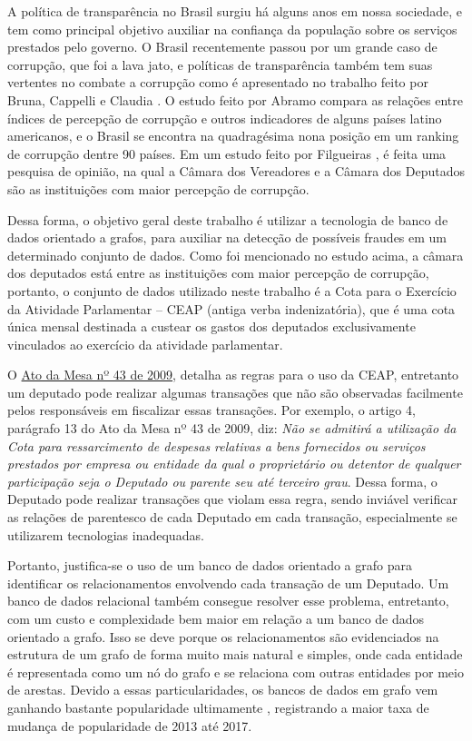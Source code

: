 \label{chap:1}

	A política de transparência no Brasil surgiu há alguns anos em nossa sociedade, e tem como principal objetivo auxiliar na confiança da população sobre os serviços prestados pelo governo. O Brasil recentemente passou por um grande caso de corrupção, que foi a lava jato, e políticas de transparência também tem suas vertentes no combate a corrupção como é apresentado no trabalho feito por Bruna, Cappelli e Claudia \cite{diirrcombate}. O estudo feito por Abramo \cite{abramo2000relaccoes} compara as relações entre índices de percepção de corrupção
e outros indicadores de alguns países latino americanos, e o Brasil se encontra na quadragésima nona posição em um ranking de corrupção dentre 90 países. Em um estudo feito por Filgueiras \cite{filgueiras2009tolerancia}, é feita uma pesquisa de opinião, na qual a Câmara dos Vereadores e a Câmara dos Deputados são as instituições com maior percepção de
corrupção.

	Dessa forma, o objetivo geral deste trabalho é utilizar a tecnologia de banco de dados orientado a grafos, para auxiliar na detecção de possíveis fraudes em um determinado conjunto de dados. Como foi mencionado no estudo acima, a câmara dos deputados está entre as instituições com maior percepção de corrupção, portanto, o conjunto de dados utilizado neste trabalho é a Cota para o Exercício da Atividade Parlamentar – CEAP (antiga verba indenizatória), que é uma cota única mensal destinada a custear os gastos dos deputados exclusivamente vinculados ao exercício da atividade parlamentar.
	
	O \href{http://www2.camara.leg.br/legin/int/atomes/2009/atodamesa-43-21-maio-2009-588364-norma-cd-mesa.html}{Ato da Mesa nº 43 de 2009}, detalha as regras para o uso da CEAP, entretanto um deputado pode realizar algumas transações que não são observadas facilmente pelos responsáveis em fiscalizar essas transações. Por exemplo, o artigo 4, parágrafo 13 do Ato da Mesa nº 43 de 2009, diz: \textit{Não se admitirá a utilização da Cota para ressarcimento de despesas relativas  a bens fornecidos ou serviços prestados por empresa ou entidade da qual o proprietário ou detentor de qualquer participação seja o Deputado ou parente seu até terceiro grau}. Dessa forma, o Deputado pode realizar transações que violam essa regra, sendo inviável verificar as relações de parentesco de cada Deputado em cada transação, especialmente se utilizarem tecnologias inadequadas.
	
	Portanto, justifica-se o uso de um banco de dados orientado a grafo para identificar os relacionamentos envolvendo cada transação de um Deputado. Um banco de dados relacional também consegue resolver esse problema, entretanto, com um custo e complexidade bem maior em relação a um banco de dados orientado a grafo. Isso se deve porque os relacionamentos são evidenciados na estrutura de um grafo de forma muito mais natural e simples, onde cada entidade é representada como um nó do grafo e se relaciona com outras entidades por meio de arestas. Devido a essas particularidades, os bancos de dados em grafo vem ganhando bastante popularidade ultimamente \cite{Dbmspopularity}, registrando a maior taxa de mudança de popularidade de 2013 até 2017.
	
